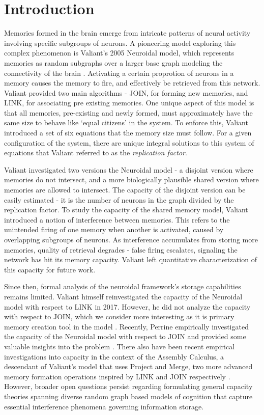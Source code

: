 \chapter{Introduction}

Memories formed in the brain emerge from intricate patterns of neural activity involving specific subgroups of neurons. A pioneering model exploring this complex phenomenon is Valiant's 2005 Neuroidal model, which represents memories as random subgraphs over a larger base graph modeling the connectivity of the brain \cite{valiant2005memorization}. Activating a certain proprotion of neurons in a memory causes the memory to fire, and effectively be retrieved from this network. Valiant provided two main algorithms - JOIN, for forming new memories, and LINK, for associating pre existing memories. One unique aspect of this model is that all memories, pre-existing and newly formed, must approximately have the same size to behave like `equal citizens' in the system. To enforce this, Valiant introduced a set of six equations that the memory size must follow. For a given configuration of the system, there are unique integral solutions to this system of equations that Valiant referred to as the \textit{replication factor}.  

Valiant investigated two versions the Neuroidal model - a disjoint version where memories do not intersect, and a more biologically plausible shared version where memories are allowed to intersect. The capacity of the disjoint version can be easily estimated - it is the number of neurons in the graph divided by the replication factor. To study the capacity of the shared memory model, Valiant introduced a notion of interference between memories. This refers to the unintended firing of one memory when another is activated, caused by overlapping subgroups of neurons. As interference accumulates from storing more memories, quality of retrieval degrades - false firing escalates, signaling the network has hit its memory capacity. Valiant left quantitative characterization of this capacity for future work.

Since then, formal analysis of the neuroidal framework's storage capabilities remains limited. Valiant himself reinvestigated the capacity of the Neuroidal model with respect to LINK in 2017. However, he did not analyze the capacity with respect to JOIN, which we consider more interesting as it is primary memory creation tool in the model \cite{valiant2017capacity}. Recently, Perrine empirically investigated the capacity of the Neuroidal model with respect to JOIN and provided some valuable insights into the problem \cite{perrine2023neural}. There also have been recent empirical investigations into capacity in the context of the Assembly Calculus, a descendant of Valiant’s model that uses Project and Merge, two more advanced memory formation operations inspired by LINK and JOIN respectively \cite{xie2023skip}. However, broader open questions persist regarding formulating general capacity theories spanning diverse random graph based models of cognition that capture essential interference phenomena governing information storage.


